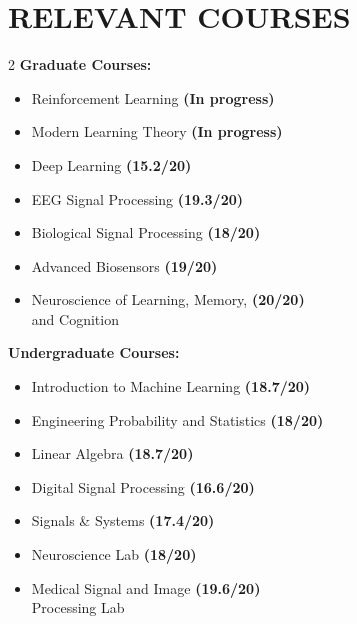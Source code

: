 \documentclass[11pt,a4paper,roman]{moderncv}        %
\begin{document}
    \section{RELEVANT COURSES}
    \vspace{-5mm}
        \begin{multicols}{2}
        \textbf{Graduate Courses:}
        \begin{itemize}
            \item Reinforcement Learning \hfill{\textbf{(In progress)}}
            \item Modern Learning Theory \hfill{\textbf{(In progress)}}
            \item Deep Learning \hfill{\textbf{(15.2/20)}}
            \item EEG Signal Processing \hfill{\textbf{(19.3/20)}}
            \item Biological Signal Processing \hfill{\textbf{(18/20)}}
            \item Advanced Biosensors \hfill{\textbf{(19/20)}}
            \item Neuroscience of Learning, Memory, \hfill{\textbf{(20/20)}}\\ and Cognition 
        \end{itemize}
        \columnbreak
        \textbf{Undergraduate Courses:}
        \begin{itemize}
            \item Introduction to Machine Learning \hfill{\textbf{(18.7/20)}}
            \item Engineering Probability and Statistics \hfill{\textbf{(18/20)}}
            \item Linear Algebra \hfill{\textbf{(18.7/20)}}
            \item Digital Signal Processing \hfill{\textbf{(16.6/20)}}
            \item Signals \& Systems \hfill{\textbf{(17.4/20)}}
           \item Neuroscience Lab \hfill{\textbf{(18/20)}}
            \item Medical Signal and Image \hfill{\textbf{(19.6/20)}} \\Processing Lab 
        \end{itemize}
        \end{multicols}
        
   \vspace{-6mm}
\end{document}
